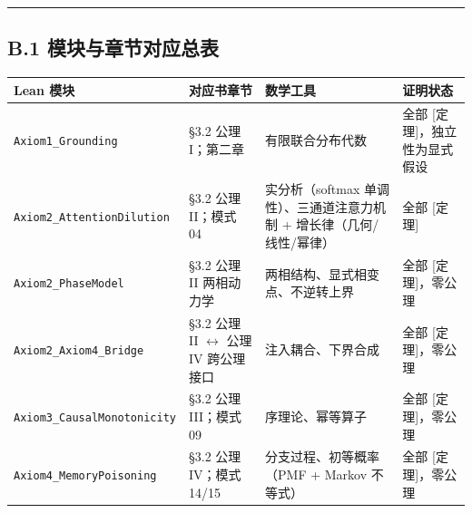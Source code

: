 \begin{center}\rule{0.5\linewidth}{0.5pt}\end{center}

\subsection{B.1
模块与章节对应总表}\label{b.1-ux6a21ux5757ux4e0eux7ae0ux8282ux5bf9ux5e94ux603bux8868}

{\def\LTcaptype{} %
\begin{longtable}[]{@{}
  >{\raggedright\arraybackslash}p{}
  >{\raggedright\arraybackslash}p{}
  >{\raggedright\arraybackslash}p{}
  >{\raggedright\arraybackslash}p{}@{}}
\toprule\noalign{}
\begin{minipage}[b]{\linewidth}\raggedright
Lean 模块
\end{minipage} & \begin{minipage}[b]{\linewidth}\raggedright
对应书章节
\end{minipage} & \begin{minipage}[b]{\linewidth}\raggedright
数学工具
\end{minipage} & \begin{minipage}[b]{\linewidth}\raggedright
证明状态
\end{minipage} \\
\midrule\noalign{}
\endhead
\bottomrule\noalign{}
\endlastfoot
\texttt{Axiom1\_Grounding} & §3.2 公理 I；第二章 & 有限联合分布代数 &
全部 {[}定理{]}，独立性为显式假设 \\
\texttt{Axiom2\_AttentionDilution} & §3.2 公理 II；模式 04 &
实分析（softmax 单调性）、三通道注意力机制 + 增长律（几何/线性/幂律） &
全部 {[}定理{]} \\
\texttt{Axiom2\_PhaseModel} & §3.2 公理 II 两相动力学 &
两相结构、显式相变点、不逆转上界 & 全部 {[}定理{]}，零公理 \\
\texttt{Axiom2\_Axiom4\_Bridge} & §3.2 公理 II \(\leftrightarrow\) 公理
IV 跨公理接口 & 注入耦合、下界合成 & 全部 {[}定理{]}，零公理 \\
\texttt{Axiom3\_CausalMonotonicity} & §3.2 公理 III；模式 09 &
序理论、幂等算子 & 全部 {[}定理{]}，零公理 \\
\texttt{Axiom4\_MemoryPoisoning} & §3.2 公理 IV；模式 14/15 &
分支过程、初等概率（PMF + Markov 不等式） & 全部 {[}定理{]}，零公理 \\

\end{longtable}}
